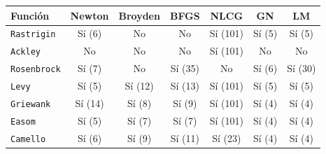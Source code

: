 \begin{tabular}{l c c c c c c}
\toprule
\rowcolor{Azul1!50}
Función & Newton & Broyden & BFGS & NLCG & GN & LM \\
\midrule
\texttt{Rastrigin} & Sí (6) & No & No & Sí (101) & Sí (5) & Sí (5) \\
\texttt{Ackley} & No & No & No & Sí (101) & No & No \\
\texttt{Rosenbrock} & Sí (7) & No & Sí (35) & No & Sí (6) & Sí (30) \\
\texttt{Levy} & Sí (5) & Sí (12) & Sí (13) & Sí (101) & Sí (5) & Sí (5) \\
\texttt{Griewank} & Sí (14) & Sí (8) & Sí (9) & Sí (101) & Sí (4) & Sí (4) \\
\texttt{Easom} & Sí (5) & Sí (7) & Sí (7) & Sí (101) & Sí (4) & Sí (4) \\
\texttt{Camello} & Sí (6) & Sí (9) & Sí (11) & Sí (23) & Sí (4) & Sí (4) \\
\bottomrule
\end{tabular}
